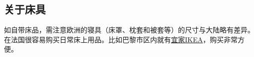 \subsection{关于床具}

如自带床品，需注意欧洲的寝具（床罩、枕套和被套等）的尺寸与大陆略有差异。在法国很容易购买日常床上用品。比如巴黎市区内就有\href{https://goo.gl/maps/zMbCesV2jhi92mcK9}{宜家IKEA}，购买非常方便。
